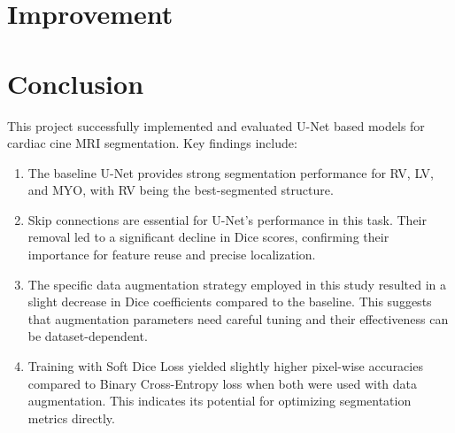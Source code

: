 \documentclass{article}
\begin{document}
\section{Improvement}




\section{Conclusion}
This project successfully implemented and evaluated U-Net based models for cardiac cine MRI segmentation. Key findings include:
\begin{enumerate}
  \item The baseline U-Net provides strong segmentation performance for RV, LV, and MYO, with RV being the best-segmented structure.
  \item Skip connections are essential for U-Net's performance in this task. Their removal led to a significant decline in Dice scores,
        confirming their importance for feature reuse and precise localization.
  \item The specific data augmentation strategy employed in this study resulted in a slight decrease in Dice coefficients compared to
        the baseline. This suggests that augmentation parameters need careful tuning and their effectiveness can be dataset-dependent.
  \item Training with Soft Dice Loss yielded slightly higher pixel-wise accuracies compared to Binary Cross-Entropy loss when both
        were used with data augmentation. This indicates its potential for optimizing segmentation metrics directly.
\end{enumerate}







\end{document}
